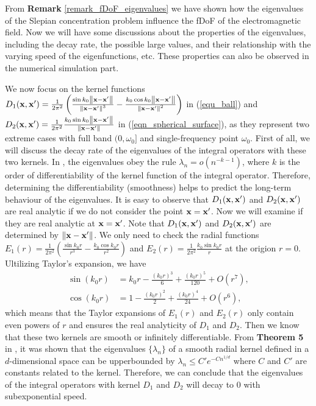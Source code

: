 \documentclass[12pt,draftclsnofoot,journal,onecolumn]{IEEEtran}
\begin{document}
{\color{red}

From {\bf Remark} \ref{remark_fDoF_eigenvalues} we have shown how the eigenvalues of the Slepian concentration problem influence the fDoF of the electromagnetic field. Now we will have some discussions about the properties of the eigenvalues, including the decay rate, the possible large values, and their relationship with the varying speed of the eigenfunctions, etc. These properties can also be observed in the numerical simulation part. 

We now focus on the kernel functions $D_1({\bf x},{\bf x}')=\frac{1}{2\pi^2} \left( \frac{\sin k_0\left\| {\bf x}-{\bf x}' \right\|}{\left\| {\bf x}-{\bf x}' \right\|^3}-\frac{k_0\cos k_0\left\| {\bf x}-{\bf x}' \right\|}{\left\| {\bf x}-{\bf x}' \right\|^2} \right)$ in (\ref{equ_ball}) and $D_2({\bf x},{\bf x}') = \frac{1}{2\pi^2} \frac{k_0\sin k_0 \left\| {\bf x}-{\bf x}' \right\|}{\left\|  {\bf x}-{\bf x}' \right\|}$ in (\ref{eqn_spherical_surface}), as they represent two extreme cases with full band $(0,\omega_0]$ and single-frequency point $\omega_0$. First of all, we will discuss the decay rate of the eigenvalues of the integral operators with these two kernels. In \cite{reade1983eigen}, the eigenvalues obey the rule $\lambda_n  = o(n^{-k-1})$, where $k$ is the order of differentiability of the kernel function of the integral operator. Therefore, determining the differentiability (smoothness) helps to predict the long-term behaviour of the eigenvalues.
It is easy to observe that $D_1({\bf x},{\bf x}')$ and $D_2({\bf x},{\bf x}')$ are real analytic if we do not consider the point ${\bf x} = {\bf x}'$. Now we will examine if they are real analytic at ${\bf x} = {\bf x}'$. 
Note that $D_1({\bf x},{\bf x}')$ and $D_2({\bf x},{\bf x}')$ are determined by $\left\|{\bf x}-{\bf x}'\right\|$. We only need to check the radial functions $E_1(r) = \frac{1}{2\pi^2} \left( \frac{\sin k_0 r}{r^3} - \frac{k_0 \cos k_0 r}{r^2} \right)$ and $E_2(r) = \frac{1}{2 \pi^2} \frac{k_0 \sin k_0 r}{r}$ at the origion $r = 0$. Ultilizing Taylor's expansion, we have 
\begin{equation}\begin{aligned}\sin(k_0r)&=k_0r-\frac{(k_0r)^3}{6}+\frac{(k_0r)^5}{120}+O(r^7),\\\cos(k_0r)&=1-\frac{(k_0r)^2}{2}+\frac{(k_0r)^4}{24}+O(r^6),\end{aligned}\end{equation}
which means that the Taylor expansions of $E_1(r)$ and $E_2(r)$ only contain even powers of $r$ and ensures the real analyticity of $D_1$ and $D_2$. Then we know that these two kernels are smooth or infinitely differentiable. From {\bf Theorem 5} in \cite{belkin2018approximation}, it was shown that the eigenvalues $\{\lambda_n\}$ of a smooth radial kernel defined in a $d$-dimensional space can be upperbounded by $\lambda_n \leqslant C' e^{-C n^{1/d}}$ where $C$ and $C'$ are constants related to the kernel. Therefore, we can conclude that the eigenvalues of the integral operators with kernel $D_1$ and $D_2$ will decay to 0 with subexponential speed.   

}
\end{document}
